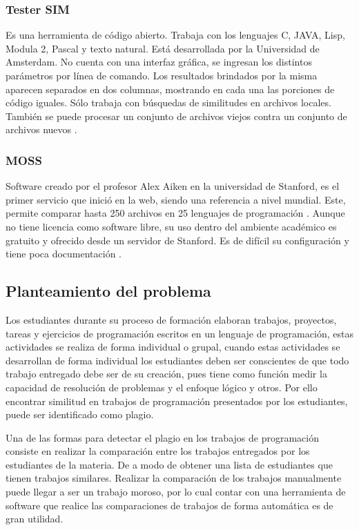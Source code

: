 \subsubsection{Tester SIM}
Es una herramienta de código abierto. Trabaja con los lenguajes C, JAVA, Lisp, Modula 2, Pascal y texto natural. Está desarrollada por la Universidad de Amsterdam. No cuenta con una interfaz gráfica, se ingresan los distintos parámetros por línea de comando. Los resultados brindados por la misma aparecen separados en dos columnas, mostrando en cada una las porciones de código iguales. Sólo trabaja con búsquedas de similitudes en archivos locales. También se puede procesar un conjunto de archivos viejos contra un conjunto de archivos nuevos  \cite{article1}.
\subsubsection{MOSS}
Software creado por el profesor Alex Aiken en la universidad de Stanford, es el primer servicio que inició en la web, siendo una referencia a nivel mundial. Este, permite comparar hasta 250 archivos en 25 lenguajes de programación \cite{Hage2010ACO}. Aunque no tiene licencia como software libre, su uso dentro del ambiente académico es gratuito y ofrecido desde un servidor de Stanford. Es de difícil su configuración y tiene poca documentación \cite{book1}.
\subsection{Planteamiento del problema}
Los estudiantes durante su proceso de formación elaboran trabajos, proyectos, tareas y ejercicios de programación escritos en un lenguaje de programación, estas actividades se realiza de forma individual o grupal, cuando estas actividades se desarrollan de forma individual los estudiantes deben ser conscientes de que todo trabajo entregado debe ser de su creación, pues tiene como función medir la capacidad de resolución de problemas y el enfoque lógico y otros. Por ello encontrar similitud en trabajos de programación presentados por los estudiantes, puede ser identificado como plagio.

Una de las formas para detectar el plagio en los trabajos de programación consiste en realizar la comparación entre los trabajos entregados por los estudiantes de la materia. De a modo de obtener una lista de estudiantes que tienen trabajos similares. Realizar la comparación de los trabajos manualmente puede llegar a ser un trabajo moroso, por lo cual contar con una herramienta de software que realice las comparaciones de trabajos de forma automática es de gran utilidad.

